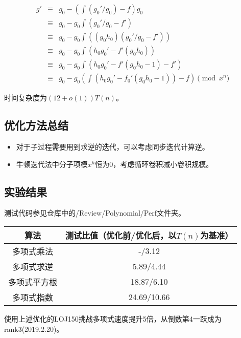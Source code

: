 \begin{eqnarray*}
    g'&\equiv&g_0-(\int(g_0'/g_0)-f)g_0\\
    &\equiv&g_0-g_0\int(g_0'/g_0-f')\\
    &\equiv&g_0-g_0\int((g_0h_0)(g_0'/g_0-f'))\\
    &\equiv&g_0-g_0\int(h_0g_0'-f'(g_0h_0))\\
    &\equiv&g_0-g_0\int(h_0g_0'-f'(g_0h_0-1)-f')\\
    &\equiv&g_0-g_0(\int(h_0g_0'-f_0'(g_0h_0-1))-f) \pmod{x^n}
\end{eqnarray*}

时间复杂度为$(12+o(1))T(n)$。
\subsection{优化方法总结}
\begin{itemize}
    \item 对于子过程需要用到求逆的迭代，可以考虑同步迭代计算逆。
    \item 牛顿迭代法中分子项模$x^h$恒为0，考虑循环卷积减小卷积规模。
\end{itemize}
\subsection{实验结果}
测试代码参见仓库中的/Review/Polynomial/Perf文件夹。

\begin{tabular}{c|c}
\hline
算法 & 测试比值（优化前/优化后，以$T(n)$为基准）\\
\hline
多项式乘法 & -/3.12\\
多项式求逆&5.89/4.44\\
多项式平方根&18.87/6.10\\
多项式指数&24.69/10.66\\
\hline
\end{tabular}

使用上述优化的LOJ150挑战多项式速度提升5倍，从倒数第4一跃成为rank3(2019.2.20)。
